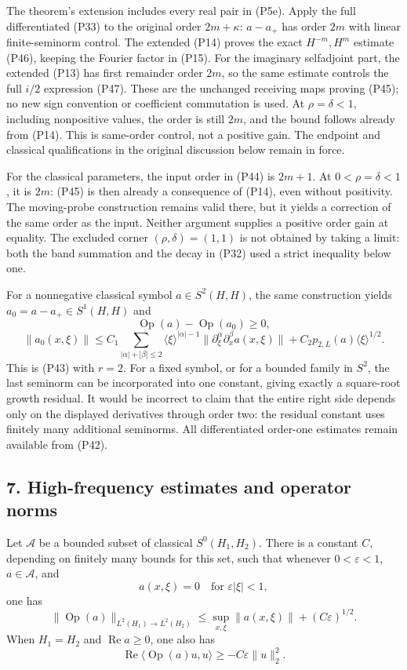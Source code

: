 \documentclass[
  11pt,
]{article}
\begin{document}
The theorem's extension includes every real pair in (P5e). Apply the
full differentiated (P33) to the original order \(2m+\kappa\): \(a-a_+\)
has order \(2m\) with linear finite-seminorm control. The extended (P14)
proves the exact \(H^{-m},H^m\) estimate (P46), keeping the Fourier
factor in (P15). For the imaginary selfadjoint part, the extended (P13)
has first remainder order \(2m\), so the same estimate controls the full
\(i/2\) expression (P47). These are the unchanged receiving maps proving
(P45); no new sign convention or coefficient commutation is used. At
\(\rho=\delta<1\), including nonpositive values, the order is still
\(2m\), and the bound follows already from (P14). This is same-order
control, not a positive gain. The endpoint and classical qualifications
in the original discussion below remain in force.

For the classical parameters, the input order in (P44) is \(2m+1\). At
\(0<\rho=\delta<1\), it is \(2m\): (P45) is then already a consequence
of (P14), even without positivity. The moving-probe construction remains
valid there, but it yields a correction of the same order as the input.
Neither argument supplies a positive order gain at equality. The
excluded corner \((\rho,\delta)=(1,1)\) is not obtained by taking a
limit: both the band summation and the decay in (P32) used a strict
inequality below one.

For a nonnegative classical symbol \(a\in S^2(H,H)\), the same
construction yields \(a_0=a-a_+\in S^1(H,H)\) and \[
 \operatorname{Op}(a)-\operatorname{Op}(a_0)\geq0,
\] \[
 \|a_0(x,\xi)\|
 \leq C_1\sum_{|\alpha|+|\beta|\leq2}
 \langle\xi\rangle^{|\alpha|-1}
 \|\partial_\xi^\alpha\partial_x^\beta a(x,\xi)\|
 +C_2p_{2,L}(a)\langle\xi\rangle^{1/2}.
\tag{P48}
\] This is (P43) with \(r=2\). For a fixed symbol, or for a bounded
family in \(S^2\), the last seminorm can be incorporated into one
constant, giving exactly a square-root growth residual. It would be
incorrect to claim that the entire right side depends only on the
displayed derivatives through order two: the residual constant uses
finitely many additional seminorms. All differentiated order-one
estimates remain available from (P42).

\subsection{7. High-frequency estimates and operator
norms}\label{high-frequency-estimates-and-operator-norms}

Let \(\mathcal A\) be a bounded subset of classical \(S^0(H_1,H_2)\).
There is a constant \(C\), depending on finitely many bounds for this
set, such that whenever \(0<\varepsilon<1\), \(a\in\mathcal A\), and \[
 a(x,\xi)=0\quad\text{for }\varepsilon|\xi|<1,
\tag{P49}
\] one has \[
 \|\operatorname{Op}(a)\|_{L^2(H_1)\to L^2(H_2)}
 \leq \sup_{x,\xi}\|a(x,\xi)\|+(C\varepsilon)^{1/2}.
\tag{P50}
\] When \(H_1=H_2\) and \(\operatorname{Re}a\geq0\), one also has \[
 \operatorname{Re}\langle\operatorname{Op}(a)u,u\rangle
 \geq-C\varepsilon\|u\|_2^2.
\tag{P51}
\]
\end{document}
